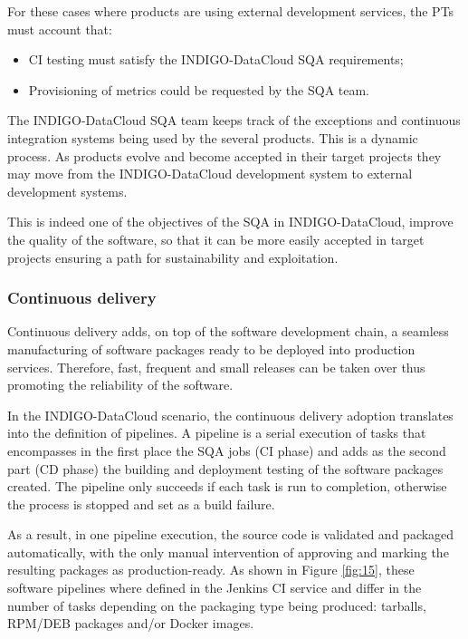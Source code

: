 \documentclass{article}
\begin{document}
For these cases where products are using external development services, the
PTs must account that:
\begin{itemize}
    \item CI testing must satisfy the INDIGO-DataCloud SQA requirements;

    \item Provisioning of metrics could be requested by the SQA
        team.

\end{itemize}

The INDIGO-DataCloud SQA team keeps track of the exceptions and continuous
integration systems being used by the several products. This is a dynamic
process. As products evolve and become accepted in their target projects they
may move from the INDIGO-DataCloud development system to external development
systems.

This is indeed one of the objectives of the SQA in INDIGO-DataCloud, improve
the quality of the software, so that it can be more easily accepted in target
projects ensuring a path for sustainability and exploitation.

\subsubsection{Continuous delivery}
Continuous delivery adds, on top of the software development chain, a seamless
manufacturing of software packages ready to be deployed into production
services. Therefore, fast, frequent and small releases can be taken over thus
promoting the reliability of the software.

In the INDIGO-DataCloud scenario, the continuous delivery adoption translates
into the definition of pipelines. A pipeline is a serial execution of tasks
that encompasses in the first place the SQA jobs (CI phase) and adds as the
second part (CD phase) the building and deployment testing of the software
packages created. The pipeline only succeeds if each task is run to completion,
otherwise the process is stopped and set as a build failure.

As a result, in one pipeline execution, the source code is validated and
packaged automatically, with the only manual intervention of approving and
marking the resulting packages as production-ready. As shown in Figure
\ref{fig:15}, these software pipelines where defined in the Jenkins CI service
and differ in the number of tasks depending on the packaging type being
produced: tarballs, RPM/DEB packages and/or Docker images.
\end{document}
